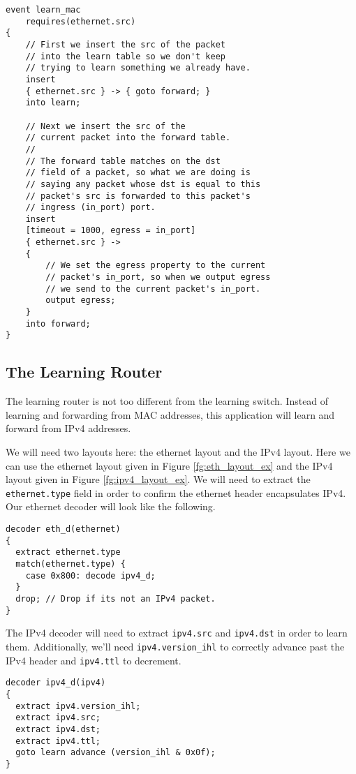 \noindent\begin{minipage}{\linewidth}
\begin{lstlisting}
event learn_mac
	requires(ethernet.src)
{
	// First we insert the src of the packet
	// into the learn table so we don't keep
	// trying to learn something we already have.
	insert
	{ ethernet.src } -> { goto forward; }
	into learn;
	
	// Next we insert the src of the
	// current packet into the forward table.
	//
	// The forward table matches on the dst
	// field of a packet, so what we are doing is
	// saying any packet whose dst is equal to this
	// packet's src is forwarded to this packet's
	// ingress (in_port) port.
	insert
	[timeout = 1000, egress = in_port]
	{ ethernet.src } ->
	{
		// We set the egress property to the current
		// packet's in_port, so when we output egress
		// we send to the current packet's in_port.
		output egress;
	}
	into forward;
}
\end{lstlisting}
\end{minipage}

\subsection{The Learning Router} \label{learning_router}

The learning router is not too different from the learning switch. Instead of learning and forwarding from MAC addresses, this application will learn and forward from IPv4 addresses.

We will need two layouts here: the ethernet layout and the IPv4 layout. Here we can use the ethernet layout given in Figure \ref{fg:eth_layout_ex} and the IPv4 layout given in Figure \ref{fg:ipv4_layout_ex}. We will need to extract the \texttt{ethernet.type} field in order to confirm the ethernet header encapsulates IPv4. Our ethernet decoder will look like the following.
\begin{lstlisting}
decoder eth_d(ethernet)
{
  extract ethernet.type
  match(ethernet.type) {
  	case 0x800: decode ipv4_d;
  }
  drop; // Drop if its not an IPv4 packet.
}
\end{lstlisting}

The IPv4 decoder will need to extract \texttt{ipv4.src} and \texttt{ipv4.dst} in order to learn them. Additionally, we'll need \texttt{ipv4.version\_ihl} to correctly advance past the IPv4 header and \texttt{ipv4.ttl} to decrement.

\begin{lstlisting}
decoder ipv4_d(ipv4)
{
  extract ipv4.version_ihl;
  extract ipv4.src;
  extract ipv4.dst;
  extract ipv4.ttl;
  goto learn advance (version_ihl & 0x0f);
}
\end{lstlisting}

